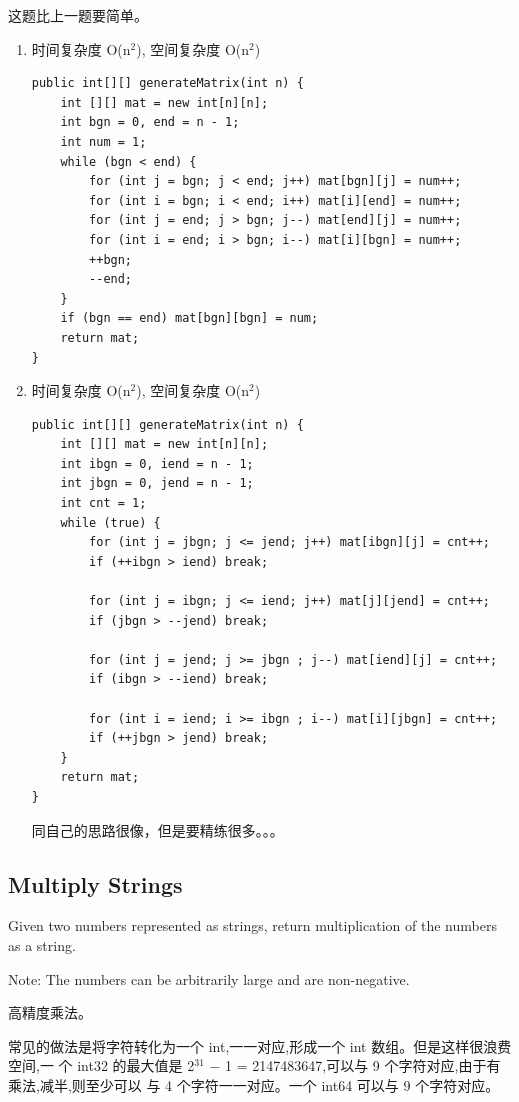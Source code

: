 \documentclass[12pt]{book}
\begin{document}
这题比上一题要简单。
\begin{enumerate}
\item 时间复杂度 O(n$^{\text{2}}$), 空间复杂度 O(n$^{\text{2}}$)
\label{sec-20-1-8-1}
\lstset{language=java,label= ,caption= ,numbers=none}
\begin{lstlisting}
public int[][] generateMatrix(int n) {
    int [][] mat = new int[n][n];
    int bgn = 0, end = n - 1;
    int num = 1;
    while (bgn < end) {
        for (int j = bgn; j < end; j++) mat[bgn][j] = num++;
        for (int i = bgn; i < end; i++) mat[i][end] = num++;
        for (int j = end; j > bgn; j--) mat[end][j] = num++;
        for (int i = end; i > bgn; i--) mat[i][bgn] = num++;
        ++bgn;
        --end;
    }
    if (bgn == end) mat[bgn][bgn] = num;
    return mat;
}
\end{lstlisting}
\item 时间复杂度 O(n$^{\text{2}}$), 空间复杂度 O(n$^{\text{2}}$)
\label{sec-20-1-8-2}
\lstset{language=java,label= ,caption= ,numbers=none}
\begin{lstlisting}
public int[][] generateMatrix(int n) {
    int [][] mat = new int[n][n];
    int ibgn = 0, iend = n - 1;
    int jbgn = 0, jend = n - 1;
    int cnt = 1;
    while (true) {
        for (int j = jbgn; j <= jend; j++) mat[ibgn][j] = cnt++;
        if (++ibgn > iend) break;

        for (int j = ibgn; j <= iend; j++) mat[j][jend] = cnt++;
        if (jbgn > --jend) break;

        for (int j = jend; j >= jbgn ; j--) mat[iend][j] = cnt++;
        if (ibgn > --iend) break;

        for (int i = iend; i >= ibgn ; i--) mat[i][jbgn] = cnt++;
        if (++jbgn > jend) break;
    }
    return mat;
}
\end{lstlisting}

同自己的思路很像，但是要精练很多。。。
\end{enumerate}

\subsection{Multiply Strings}
\label{sec-20-1-9}
Given two numbers represented as strings, return multiplication of the numbers as a string.

Note: The numbers can be arbitrarily large and are non-negative.

高精度乘法。

常见的做法是将字符转化为一个 int,一一对应,形成一个 int 数组。但是这样很浪费空间,一
个 int32 的最大值是 2$^{\text{31}}$ − 1 = 2147483647,可以与 9 个字符对应,由于有乘法,减半,则至少可以
与 4 个字符一一对应。一个 int64 可以与 9 个字符对应。
\end{document}
